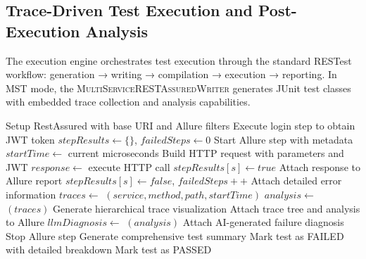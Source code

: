 \documentclass[conference]{IEEEtran}
\begin{document}
\subsection{Trace-Driven Test Execution and Post-Execution Analysis}
\label{ssec:exec}

The execution engine orchestrates test execution through the standard RESTest workflow: generation → writing → compilation → execution → reporting. In MST mode, the \textsc{MultiServiceRESTAssuredWriter} generates JUnit test classes with embedded trace collection and analysis capabilities.

\begin{algorithm}[tb]
\caption{GENERATED\_TEST\_EXECUTION\_FLOW}\label{alg:execute}
\footnotesize
\begin{algorithmic}[1]
\Require{}
\Ensure{}
\State Setup RestAssured with base URI and Allure filters
    \State Execute login step to obtain JWT token
    \State $stepResults \gets \{\}$, $failedSteps \gets 0$
        \State Start Allure step with metadata
        \State $startTime \gets$ current microseconds
        \State Build HTTP request with parameters and JWT
        \State $response \gets$ execute HTTP call
            \State $stepResults[s] \gets true$
            \State Attach response to Allure report
        \Else
            \State $stepResults[s] \gets false$, $failedSteps++$
            \State Attach detailed error information
        \EndIf
        \State $traces \gets$ $(service, method, path, startTime)$
            \State $analysis \gets$ $(traces)$
            \State Generate hierarchical trace visualization
            \State Attach trace tree and analysis to Allure
                \State $llmDiagnosis \gets$ $(analysis)$
                \State Attach AI-generated failure diagnosis
            \EndIf
        \EndIf
        \State Stop Allure step
    \EndFor
    \State Generate comprehensive test summary
        \State Mark test as FAILED with detailed breakdown
    \Else
        \State Mark test as PASSED
    \EndIf
\EndFor
\end{algorithmic}
\end{algorithm}
\end{document}
